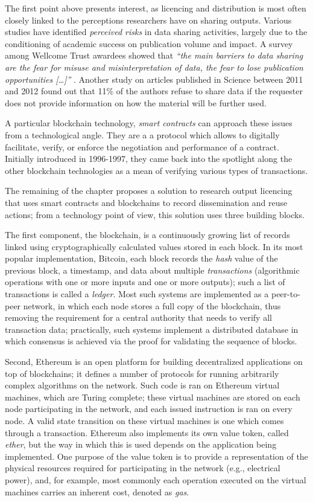 The first point above presents interest, as licencing and distribution is most often closely linked to the perceptions researchers have on sharing outputs. Various studies \cite{federer,kim} have identified \emph{perceived risks} in data sharing activities, largely due to the conditioning of academic success on publication volume and impact. A survey among Wellcome Trust awardees showed that \emph{``the main barriers to data sharing are  the fear for misuse and misinterpretation of data, the fear to lose publication opportunities [\ldots]''} \cite{wellcome}. Another study on articles published in Science between 2011 and 2012 found out that 11\% of the authors refuse to share data if the requester does not provide information on how the material will be further used\cite{stodden}.

A particular blockchain technology, \emph{smart contracts} can approach these issues from a technological angle. They are a a protocol which allows to digitally facilitate, verify, or enforce the negotiation and performance of a contract. Initially introduced in 1996-1997\cite{szabo}, they came back into the spotlight along the other blockchain technologies as a mean of verifying various types of transactions. 

The remaining of the chapter proposes a solution to research output licencing that uses smart contracts and blockchains to record dissemination and reuse actions; from a technology point of view, this solution uses three building blocks.

The first component, the blockchain, is a continuously growing list of records linked using cryptographically calculated values stored in each block. In its most popular implementation, Bitcoin, each block records the \emph{hash} value of the previous block, a timestamp, and data about multiple \emph{transactions} (algorithmic operations with one or more inputs and one or more outputs); such a list of transactions is called a \emph{ledger}. Most such systems are implemented as a peer-to-peer network, in which each node stores a full copy of the blockchain, thus removing the requirement for a central authority that needs to verify all transaction data; practically, such systems implement a distributed database in which consensus is achieved via the proof for validating the sequence of blocks.

Second, Ethereum is an open platform for building decentralized applications on top of blockchains; it defines a number of protocols for running arbitrarily complex algorithms on the network. Such code is ran on Ethereum virtual machines, which are Turing complete; these virtual machines are stored on each node participating in the network, and each issued instruction is ran on every node. A valid state transition on these virtual machines is one which comes through a transaction\cite{gavin}. Ethereum also implements its own value token, called \emph{ether}, but the way in which this is used depends on the application being implemented. One purpose of the value token is to provide a representation of the physical resources required for participating in the network (e.g., electrical power), and, for example, most commonly each operation executed on the virtual machines carries an inherent cost, denoted as \emph{gas}\cite{gavin}.

